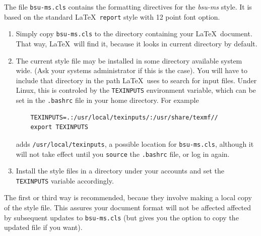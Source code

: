 \documentclass[proposal]{bsu-ms}
\begin{document}
The file \texttt{bsu-ms.cls} contains the formatting directives for the
\emph{bsu-ms} style.  It is based on the standard \LaTeX\ \texttt{report} style
with 12 point font option.  
\begin{enumerate}
\item Simply copy \texttt{bsu-ms.cls} to the directory containing your \LaTeX\
document.  That way, \LaTeX\ will find it, because it looks in
current directory by default.  

\item The current style file may be installed in some directory available
system wide.  (Ask your systems administrator if this is the case).
You will have to include that directory in the path \LaTeX\ uses to search 
for input files.  Under Linux, this is controled by the \texttt{TEXINPUTS}
environment variable, which can be set in the \texttt{.bashrc} file in your 
home directory.  For example
%
\begin{verbatim}
    TEXINPUTS=.:/usr/local/texinputs/:/usr/share/texmf//
    export TEXINPUTS
\end{verbatim}
  adds \texttt{/usr/local/texinputs}, a possible location for
  \texttt{bsu-ms.cls}, although it will not take effect until you
  \texttt{source} the \texttt{.bashrc} file, or log in again.

\item Install the style files in a directory under your accounts and set the
\texttt{TEXINPUTS} variable accordingly.
\end{enumerate}
%
The first or third way is recommended, becaue they involve making a local copy
of the style file.  This assures your document format will not be affected
affected by subsequent updates to \texttt{bsu-ms.cls} (but gives you the
option to copy the updated file if you want).
\end{document}

